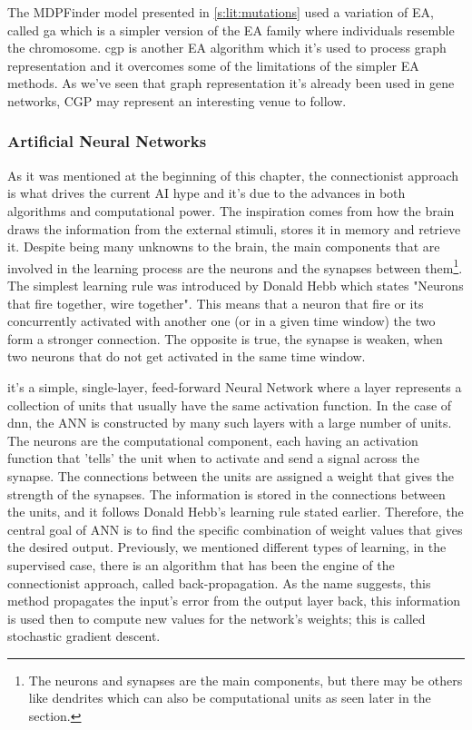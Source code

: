 The MDPFinder model presented in \cref{s:lit:mutations} used a variation of EA, called \acrfull{ga} which is a simpler version of the EA family where individuals resemble the chromosome. \acrfull{cgp} is another EA algorithm which it's used to process graph representation and it overcomes some of the limitations of the simpler EA methods. As we've seen that graph representation it's already been used in gene networks, CGP may represent an interesting venue to follow. 


\subsubsection{Artificial Neural Networks} \label{s:lit:ann_overview}

As it was mentioned at the beginning of this chapter, the connectionist approach is what drives the current AI hype and it's due to the advances in both algorithms and computational power. The inspiration comes from how the brain draws the information from the external stimuli, stores it in memory and retrieve it. Despite being many unknowns to the brain, the main components that are involved in the learning process are the neurons and the synapses between them\footnote{The neurons and synapses are the main components, but there may be others like dendrites which can also be computational units as seen later in the section.}. The simplest learning rule was introduced by Donald Hebb which states "Neurons that fire together, wire together"\cite{Hebb_Donald1949-nn}. This means that a neuron that fire or its concurrently activated with another one (or in a given time window) the two form a stronger connection. The opposite is true, the synapse is weaken, when two neurons that do not get activated in the same time window.

 it's a simple, single-layer, feed-forward Neural Network where a layer represents a collection of units that usually have the same activation function. In the case of \acrfull{dnn}, the ANN is constructed by many such layers with a large number of units. The neurons are the computational component, each having an activation function that 'tells' the unit when to activate and send a signal across the synapse. The connections between the units are assigned a weight that gives the strength of the synapses. The information is stored in the connections between the units, and it follows Donald Hebb's learning rule stated earlier. Therefore, the central goal of ANN is to find the specific combination of weight values that gives the desired output. Previously, we mentioned different types of learning, in the supervised case, there is an algorithm that has been the engine of the connectionist approach, called back-propagation. As the name suggests, this method propagates the input's error from the output layer back, this information is used then to compute new values for the network's weights; this is called stochastic gradient descent.

